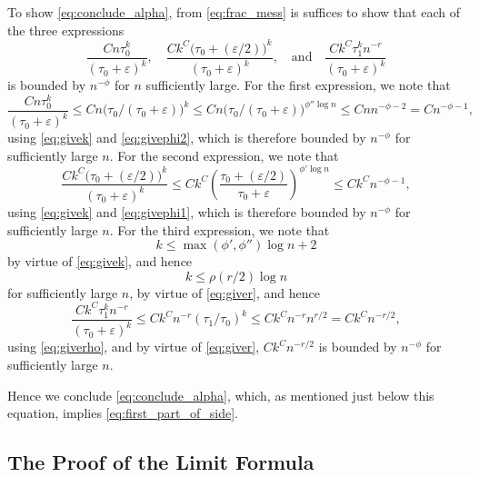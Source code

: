 \documentclass{memo-l}
\theoremstyle{plain}
\theoremstyle{definition}
\numberwithin{section}{chapter}
\numberwithin{equation}{chapter}
\theoremstyle{plain}
\theoremstyle{definition}
\begin{document}
To show \eqref{eq:conclude_alpha}, from \eqref{eq:frac_mess} is suffices to
show that each of the three expressions \[
\frac{Cn\tau_0^k}{(\tau_0+\varepsilon)^k } ,\quad
\frac{Ck^C\bigl(\tau_0+(\varepsilon/2)\bigr)^k}{(\tau_0+\varepsilon)^k },
\quad \mbox{and}\quad \frac{Ck^C\tau_1^k n^{-r}}{(\tau_0+\varepsilon)^k }
\] is bounded by \( n^{-\phi} \) for \( n \) sufficiently large.  For the
first expression, we note that \[ \frac{Cn\tau_0^k}{(\tau_0+\varepsilon)^k
} \le Cn \bigl(\tau_0/(\tau_0+\varepsilon)\bigr)^k \le Cn
\bigl(\tau_0/(\tau_0+\varepsilon)\bigr)^{\phi''\log n} \leq Cn
n^{-\phi-2}=C n^{-\phi-1}, \] using \eqref{eq:givek} and
\eqref{eq:givephi2}, which is therefore bounded by \( n^{-\phi} \) for
sufficiently large \( n \).  For the second expression, we note that \[
\frac{Ck^C\bigl(\tau_0+(\varepsilon/2)\bigr)^k}{(\tau_0+\varepsilon)^k }
\le Ck^C
\left(\frac{\tau_0+(\varepsilon/2)}{\tau_0+\varepsilon}\right)^{\phi'\log
n} \leq Ck^C n^{-\phi-1}, \] using \eqref{eq:givek} and
\eqref{eq:givephi1}, which is therefore bounded by \( n^{-\phi} \) for
sufficiently large \( n \).  For the third expression, we note that \[ k
\leq \max(\phi',\phi'')\log n + 2 \] by virtue of \eqref{eq:givek}, and
hence \[ k \leq \rho (r/2) \log n \] for sufficiently large \( n \), by
virtue of \eqref{eq:giver}, and hence \[ \frac{Ck^C\tau_1^k
n^{-r}}{(\tau_0+\varepsilon)^k }  \le Ck^C n^{-r} ( \tau_1/\tau_0)^k \le
Ck^C n^{-r} n^{r/2} = Ck^C n^{-r/2}, \] using \eqref{eq:giverho}, and by
virtue of \eqref{eq:giver}, \( Ck^C n^{-r/2} \) is bounded by \( n^{-\phi}
\) for sufficiently large \( n \).

Hence we conclude \eqref{eq:conclude_alpha}, which, as mentioned just below
this equation, implies \eqref{eq:first_part_of_side}.



%
%
%
%
\subsection{The Proof of the Limit Formula}
\end{document}
